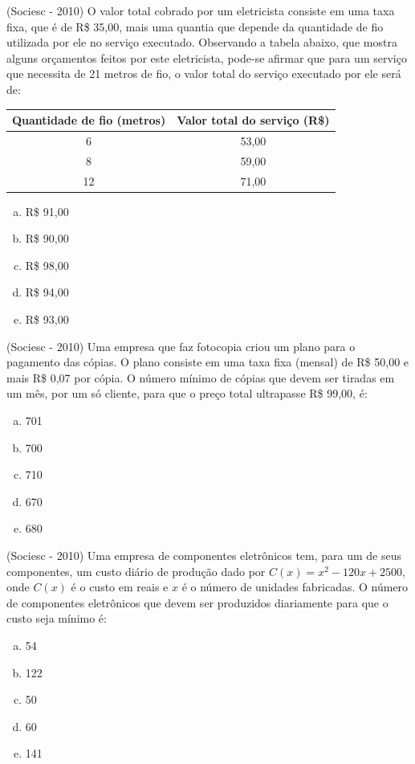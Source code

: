   \begin{exer}
  (Sociesc - 2010) O valor total cobrado por um eletricista consiste em uma taxa fixa, que é de R\$ 35,00, mais uma quantia que depende da quantidade de fio utilizada por ele no serviço executado. Observando a tabela abaixo, que mostra alguns orçamentos feitos por este eletricista, pode-se afirmar que para um serviço que necessita de 21 metros de fio, o valor total do serviço executado por ele será de:

  \begin{table}[H]
  \centering
 \begin{tabular}{|c|c|} \hline
  \multicolumn{1}{|c|}{\textbf{Quantidade de fio
(metros)}} & \multicolumn{1}{|c|}{\textbf{Valor total do serviço
(R\$)}} \\ \hline
 6 & 53,00 \\ \hline
 8 & 59,00 \\ \hline
 12 & 71,00 \\ \hline
 \end{tabular}
\end{table}

  \begin{enumerate}[a)]
  \item R\$ 91,00
  \item R\$ 90,00
  \item R\$ 98,00
  \item R\$ 94,00
  \item R\$ 93,00
 \end{enumerate}
  \end{exer}
  
  \begin{exer}
  (Sociesc - 2010) Uma empresa que faz fotocopia criou um plano para o pagamento das cópias. O plano consiste em uma taxa fixa (mensal) de R\$ 50,00 e mais R\$ 0,07 por cópia. O número mínimo de cópias que devem ser tiradas em um mês, por um só cliente, para que o preço total ultrapasse R\$ 99,00, é:
  \begin{enumerate}[a)]
  \item 701
  \item 700
  \item 710
  \item 670
  \item 680
 \end{enumerate}
  \end{exer}
  
  \begin{exer}
  (Sociesc - 2010) Uma empresa de componentes eletrônicos tem, para um de seus componentes, um custo diário de produção dado por $C(x) = x^2 - 120x + 2500$, onde $C(x)$ é o custo em reais e $x$ é o número de unidades fabricadas. O número de componentes eletrônicos que devem ser produzidos diariamente para que o custo seja mínimo é:
 \begin{enumerate}[a)]
  \item 54
  \item 122
  \item 50
  \item 60
  \item 141
 \end{enumerate}
  \end{exer}
  
